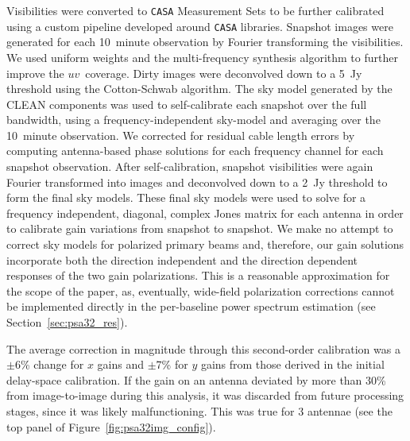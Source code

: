 Visibilities were converted to {\tt CASA} Measurement Sets to be further calibrated using a custom pipeline developed around {\tt CASA} libraries. Snapshot images were generated for each 10~minute observation by Fourier transforming the visibilities. 
We used uniform weights and the multi-frequency synthesis algorithm to further improve the $uv$~coverage. 
Dirty images were deconvolved down to a 5~Jy threshold using the Cotton-Schwab algorithm. 
The sky model generated by the CLEAN components was used to self-calibrate each snapshot over the full bandwidth, using a frequency-independent sky-model and averaging over the 10~minute observation.
We corrected for residual cable length errors by computing antenna-based phase solutions for each frequency channel for each snapshot observation. 
After self-calibration, snapshot visibilities were again Fourier transformed into images and deconvolved down to a 2~Jy threshold to form the final sky models. 
These final sky models were used to solve for a frequency independent, diagonal, complex Jones matrix \citep{HBS.1.96,Smirnov.11} for each antenna in order to calibrate gain variations from snapshot to snapshot. 
We make no attempt to correct sky models for polarized primary beams and, therefore, our gain solutions incorporate both the direction independent and the direction dependent responses of the two gain polarizations. 
This is a reasonable approximation for the scope of the paper, as, eventually, wide-field polarization corrections cannot be implemented directly in the per-baseline 
power spectrum estimation (see Section~\ref{sec:psa32_res}).

The average correction in magnitude through this second-order calibration was a $\pm$6\% change for $x$ gains and $\pm$7\% for $y$ gains from those derived in the initial delay-space calibration.
If the gain on an antenna deviated by more than 30\% from image-to-image during this analysis, it was discarded from future processing stages, since it was likely malfunctioning. This was true for 3 antennae (see the top panel of Figure~\ref{fig:psa32img_config}). 

